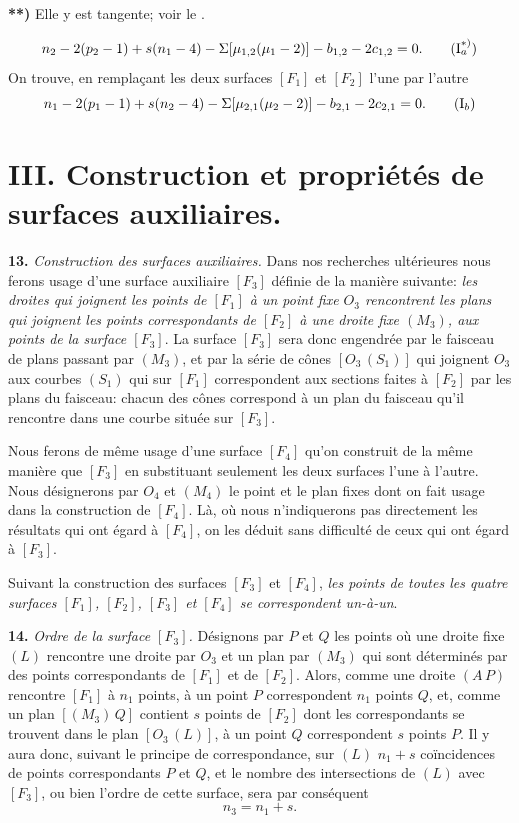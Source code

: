 \documentclass{article}
\begin{document}
\textbf{**)} Elle y est tangente; voir le .

\[
n_2 - 2(p_2 - 1) + s(n_1 - 4) - \Sigma [\mu_{1, 2}(\mu_1 - 2)] - b_{1, 2} - 2c_{1, 2} = 0. \tag{$\mathrm{I}_a^{*)}$}
\]
On trouve, en remplaçant les deux surfaces $[F_1]$ et $[F_2]$ l'une par l'autre
\[
n_1 - 2(p_1 - 1) + s(n_2 - 4) - \Sigma [\mu_{2, 1}(\mu_2 - 2)] - b_{2, 1} - 2c_{2, 1} = 0. \tag{$\mathrm{I}_b$}
\]

\section*{III. Construction et propriétés de surfaces auxiliaires.}

\textbf{13.} \emph{Construction des surfaces auxiliaires.} Dans nos recherches ultérieures nous ferons usage d'une surface auxiliaire $[F_3]$ définie de la manière suivante: \emph{les droites qui joignent les points de $[F_1]$ à un point fixe $O_3$ rencontrent les plans qui joignent les points correspondants de $[F_2]$ à une droite fixe $(M_3)$, aux points de la surface $[F_3]$}. La surface $[F_3]$ sera donc engendrée par le faisceau de plans passant par $(M_3)$, et par la série de cônes $[O_3\,(S_1)]$ qui joignent $O_3$ aux courbes $(S_1)$ qui sur $[F_1]$ correspondent aux sections faites à $[F_2]$ par les plans du faisceau: chacun des cônes correspond à un plan du faisceau qu'il rencontre dans une courbe située sur $[F_3]$.

Nous ferons de même usage d'une surface $[F_4]$ qu'on construit de la même manière que $[F_3]$ en substituant seulement les deux surfaces l'une à l'autre. Nous désignerons par $O_4$ et $(M_4)$ le point et le plan fixes dont on fait usage dans la construction de $[F_4]$. Là, où nous n'indiquerons pas directement les résultats qui ont égard à $[F_4]$, on les déduit sans difficulté de ceux qui ont égard à $[F_3]$.

Suivant la construction des surfaces $[F_3]$ et $[F_4]$, \emph{les points de toutes les quatre surfaces $[F_1]$, $[F_2]$, $[F_3]$ et $[F_4]$ se correspondent un-à-un}.

\textbf{14.} \emph{Ordre de la surface $[F_3]$.} Désignons par $P$ et $Q$ les points où une droite fixe $(L)$ rencontre une droite par $O_3$ et un plan par $(M_3)$ qui sont déterminés par des points correspondants de $[F_1]$ et de $[F_2]$. Alors, comme une droite $(A\,P)$ rencontre $[F_1]$ à $n_1$ points, à un point $P$ correspondent $n_1$ points $Q$, et, comme un plan $[(M_3)\,Q]$ contient $s$ points de $[F_2]$ dont les correspondants se trouvent dans le plan $[O_3\,(L)]$, à un point $Q$ correspondent $s$ points $P$. Il y aura donc, suivant le principe de correspondance, sur $(L)$ $n_1 + s$ coïncidences de points correspondants $P$ et $Q$, et le nombre des intersections de $(L)$ avec $[F_3]$, ou bien l'ordre de cette surface, sera par conséquent
\[
n_3 = n_1 + s.
\]
\end{document}
